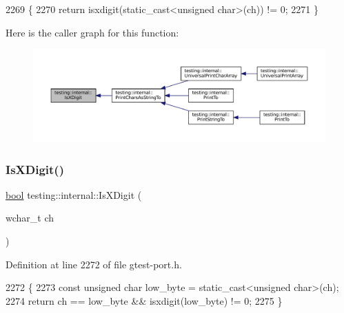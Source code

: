 \begin{DoxyCode}
2269                               \{
2270   \textcolor{keywordflow}{return} isxdigit(static\_cast<unsigned char>(ch)) != 0;
2271 \}
\end{DoxyCode}
Here is the caller graph for this function\+:
\nopagebreak
\begin{figure}[H]
\begin{center}
\leavevmode
\includegraphics[width=350pt]{namespacetesting_1_1internal_aa234ef141278263fb143b616c74c86e7_icgraph}
\end{center}
\end{figure}
\mbox{\label{namespacetesting_1_1internal_a6ab68a30f8291c09b2289c132bbe3b16}} 
\subsubsection{\texorpdfstring{Is\+X\+Digit()}{IsXDigit()}\hspace{0.1cm}{\footnotesize\ttfamily [2/2]}}
{\footnotesize\ttfamily \hyperlink{classbool}{bool} testing\+::internal\+::\+Is\+X\+Digit (\begin{DoxyParamCaption}\item[{wchar\+\_\+t}]{ch }\end{DoxyParamCaption})\hspace{0.3cm}{\ttfamily [inline]}}



Definition at line 2272 of file gtest-\/port.\+h.


\begin{DoxyCode}
2272                                  \{
2273   \textcolor{keyword}{const} \textcolor{keywordtype}{unsigned} \textcolor{keywordtype}{char} low\_byte = \textcolor{keyword}{static\_cast<}\textcolor{keywordtype}{unsigned} \textcolor{keywordtype}{char}\textcolor{keyword}{>}(ch);
2274   \textcolor{keywordflow}{return} ch == low\_byte && isxdigit(low\_byte) != 0;
2275 \}
\end{DoxyCode}
\mbox{\label{namespacetesting_1_1internal_a61d60981533cb0875bad9025e0d98b74}} 
